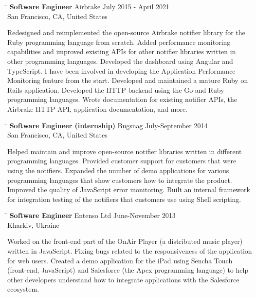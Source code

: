 \documentclass{res}
\begin{document}
\begin{resume}
  \begin{tabbing}
    \hspace{2.3in}\= \hspace{2.6in}\= \kill
    {\bf Software Engineer}  \>Airbrake \> \hspace{-0.3in} July 2015 - April 2021\\
    \>San Francisco, CA, United States
  \end{tabbing}\vspace{-20pt}
  Redesigned and reimplemented the open-source Airbrake notifier library for the
  Ruby programming language from scratch. Added performance monitoring
  capabilities and improved existing APIs for other notifier libraries written
  in other programming languages. Developed the dashboard using Angular and
  TypeScript. I have been involved in developing the Application Performance
  Monitoring feature from the start. Developed and maintained a mature Ruby on
  Rails application. Developed the HTTP backend using the Go and Ruby
  programming languages. Wrote documentation for existing notifier APIs, the
  Airbrake HTTP API, application documentation, and more.

  \begin{tabbing}
    \hspace{2.3in}\= \hspace{2.6in}\= \kill
    {\bf Software Engineer (internship)}  \>Bugsnag \> \hspace{-0.2in} July-September  2014\\
    \>San Francisco, CA, United States
  \end{tabbing}\vspace{-20pt}
  Helped maintain and improve open-source notifier libraries written in
  different programming languages. Provided customer support for customers that
  were using the notifiers. Expanded the number of demo applications for various
  programming languages that show customers how to integrate the product.
  Improved the quality of JavaScript error monitoring. Built an internal
  framework for integration testing of the notifiers that customers use using
  Shell scripting.

  \begin{tabbing}
    \hspace{2.3in}\= \hspace{2.6in}\= \kill
    {\bf Software Engineer}  \>Entenso Ltd \> \hspace{-0.2in} June-November 2013\\
    \>Kharkiv, Ukraine
  \end{tabbing}\vspace{-20pt}
  Worked on the front-end part of the OnAir Player (a distributed music player)
  written in JavaScript. Fixing bugs related to the responsiveness of the
  application for web users. Created a demo application for the iPad using
  Sencha Touch (front-end, JavaScript) and Salesforce (the Apex programming
  language) to help other developers understand how to integrate applications
  with the Salesforce ecosystem.


\end{resume}
\end{document}
